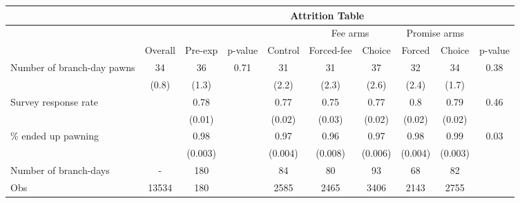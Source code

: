 \begin{tabular}{lccccccccc}
\toprule
      & \multicolumn{9}{c}{Attrition Table} \\
\midrule
      &       &       &       &       & \multicolumn{2}{c}{Fee arms} & \multicolumn{2}{c}{Promise arms} &  \\
\midrule
\midrule
      & \multicolumn{1}{p{4.045em}}{Overall} & \multicolumn{1}{p{3.5em}}{Pre-exp} & \multicolumn{1}{p{3.365em}}{p-value} & \multicolumn{1}{p{3.275em}}{Control} & \multicolumn{1}{p{4.775em}}{Forced-fee} & \multicolumn{1}{p{3em}}{Choice} & \multicolumn{1}{p{3em}}{Forced} & \multicolumn{1}{p{3em}}{Choice } & \multicolumn{1}{p{3.365em}}{p-value} \\
\midrule
\midrule
Number of branch-day pawns & 34    & 36    & 0.71  & 31    & 31    & 37    & 32    & 34    & 0.38 \\
      & (0.8) & (1.3) &       & (2.2) & (2.3) & (2.6) & (2.4) & (1.7) &  \\
Survey response rate &       & 0.78  &       & 0.77  & 0.75  & 0.77  & 0.8   & 0.79  & 0.46 \\
      &       & (0.01) &       & (0.02) & (0.03) & (0.02) & (0.02) & (0.02) &  \\
\% ended up pawning &       & 0.98  &       & 0.97  & 0.96  & 0.97  & 0.98  & 0.99  & 0.03 \\
      &       & (0.003) &       & (0.004) & (0.008) & (0.006) & (0.004) & (0.003) &  \\
Number of branch-days & -     & 180   &       & 84    & 80    & 93    & 68    & 82    &  \\
\midrule
Obs   & 13534 & 180   &       & 2585  & 2465  & 3406  & 2143  & 2755  &  \\
\bottomrule
\bottomrule
\end{tabular}%
